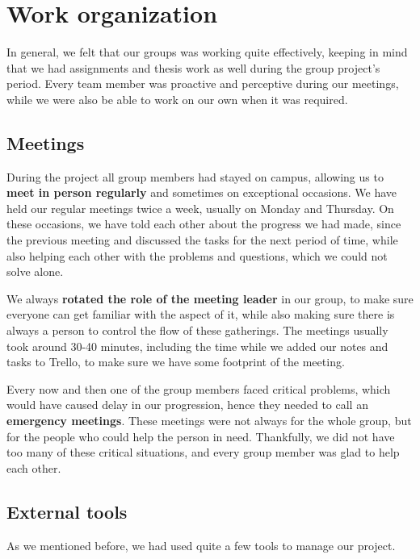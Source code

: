 \documentclass[a4paper, 11pt, article]{report}
\begin{document}

\chapter{Work organization}

In general, we felt that our groups was working quite effectively, keeping in mind that we had assignments and thesis work as well during the group project's period. Every team member was proactive and perceptive during our meetings, while we were also be able to work on our own when it was required.
   
\section{Meetings}

During the project all group members had stayed on campus, allowing us to \textbf{meet in person regularly} and sometimes on exceptional occasions. We have held our regular meetings twice a week, usually on Monday and Thursday. On these occasions, we have told each other about the progress we had made, since the previous meeting and discussed the tasks for the next period of time, while also helping each other with the problems and questions, which we could not solve alone.

We always \textbf{rotated the role of the meeting leader} in our group, to make sure everyone can get familiar with the aspect of it, while also making sure there is always a person to control the flow of these gatherings. The meetings usually took around 30-40 minutes, including the time while we added our notes and tasks to Trello, to make sure we have some footprint of the meeting.

Every now and then one of the group members faced critical problems, which would have caused delay in our progression, hence they needed to call an \textbf{emergency meetings}. These meetings were not always for the whole group, but for the people who could help the person in need. Thankfully, we did not have too many of these critical situations, and every group member was glad to help each other.
   
\section{External tools}

As we mentioned before, we had used quite a few tools to manage our project. 
\end{document}
